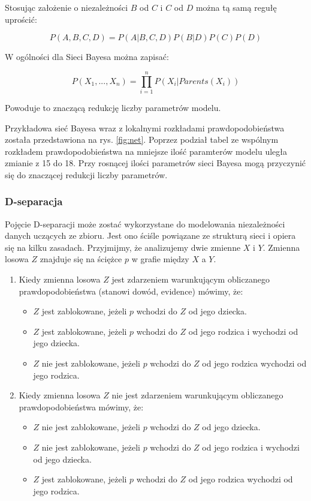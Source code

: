 \documentclass{article}
\begin{document}
Stosując założenie o niezależności $B$ od $C$ i $C$ od $D$ można tą samą regułę uprościć:

\begin{equation}
	P(A, B, C, D) = P(A|B, C, D)P(B|D)P(C)P(D)
\end{equation}

W ogólności dla Sieci Bayesa można zapisać:

\begin{equation}
	P(X_1, ... , X_n) = \prod_{i=1}^{n} P(X_i|Parents(X_i))
\end{equation}

Powoduje to znaczącą redukcję liczby parametrów modelu.

Przykładowa sieć Bayesa wraz z lokalnymi rozkładami prawdopodobieństwa została przedstawiona na rys. \ref{fig:net}. Poprzez podział tabel ze wspólnym rozkładem prawdopodobieństwa na mniejsze ilość paramterów modelu uległa zmianie z 15 do 18. Przy rosnącej ilości parametrów sieci Bayesa mogą przyczynić się do znaczącej redukcji liczby parametrów.

\subsubsection{D-separacja}

Pojęcie D-separacji może zostać wykorzystane do modelowania niezależności danych uczących ze zbioru. Jest ono ściśle powiązane ze strukturą sieci i opiera się na kilku zasadach. Przyjmijmy, że analizujemy dwie zmienne $X$ i $Y$. Zmienna losowa $Z$ znajduje się na ściężce $p$ w grafie między $X$ a $Y$.
\begin{enumerate}
\item Kiedy zmienna losowa $Z$ jest zdarzeniem warunkującym obliczanego prawdopodobieństwa (stanowi dowód, evidence) mówimy, że:
\begin{itemize}
 \item $Z$ jest zablokowane, jeżeli $p$ wchodzi do $Z$ od jego dziecka.
 \item $Z$ jest zablokowane, jeżeli $p$ wchodzi do $Z$ od jego rodzica i wychodzi od jego dziecka.
 \item $Z$ nie jest zablokowane, jeżeli $p$ wchodzi do $Z$ od jego rodzica wychodzi od jego rodzica.
\end{itemize}
\item Kiedy zmienna losowa $Z$ nie jest zdarzeniem warunkującym obliczanego prawdopodobieństwa mówimy, że:
\begin{itemize}
 \item $Z$ nie jest zablokowane, jeżeli $p$ wchodzi do $Z$ od jego dziecka.
 \item $Z$ nie jest zablokowane, jeżeli $p$ wchodzi do $Z$ od jego rodzica i wychodzi od jego dziecka.
 \item $Z$ jest zablokowane, jeżeli $p$ wchodzi do $Z$ od jego rodzica wychodzi od jego rodzica.
\end{itemize}
\end{enumerate}
\end{document}
